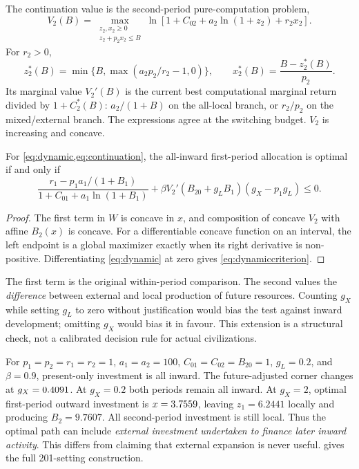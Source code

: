 The continuation value is the second-period pure-computation problem,
\begin{equation}
 V_2(B)=\max_{\substack{z_2,x_2\geq0\\z_2+p_2x_2\leq B}}\ln[1+C_{02}+a_2\ln(1+z_2)+r_2x_2].
 \label{eq:continuation}
\end{equation}
For $r_2>0$,
\begin{equation}
 z_2^*(B)=\min\{B,\max(a_2p_2/r_2-1,0)\},\qquad
 x_2^*(B)=\frac{B-z_2^*(B)}{p_2}.
 \label{eq:stage2}
\end{equation}
Its marginal value $V_2'(B)$ is the current best computational marginal return divided by $1+C_2^*(B)$: $a_2/(1+B)$ on the all-local branch, or $r_2/p_2$ on the mixed/external branch. The expressions agree at the switching budget. $V_2$ is increasing and concave.

\begin{proposition}
\label{prop:dynamic}
For \cref{eq:dynamic,eq:continuation}, the all-inward first-period allocation is optimal if and only if
\begin{equation}
 \frac{r_1-p_1a_1/(1+B_1)}{1+C_{01}+a_1\ln(1+B_1)}
 +\beta V_2'(B_{20}+g_LB_1)(g_X-p_1g_L)\leq0.
 \label{eq:dynamiccriterion}
\end{equation}
\end{proposition}
\begin{proof}
The first term in $W$ is concave in $x$, and composition of concave $V_2$ with affine $B_2(x)$ is concave. For a differentiable concave function on an interval, the left endpoint is a global maximizer exactly when its right derivative is non-positive. Differentiating \cref{eq:dynamic} at zero gives \cref{eq:dynamiccriterion}.
\end{proof}

The first term is the original within-period comparison. The second values the \emph{difference} between external and local production of future resources. Counting $g_X$ while setting $g_L$ to zero without justification would bias the test against inward development; omitting $g_X$ would bias it in favour. This extension is a structural check, not a calibrated decision rule for actual civilizations.

For $p_1=p_2=r_1=r_2=1$, $a_1=a_2=100$, $C_{01}=C_{02}=B_{20}=1$, $g_L=0.2$, and $\beta=0.9$, present-only investment is all inward. The future-adjusted corner changes at $g_X=0.4091$. At $g_X=0.2$ both periods remain all inward. At $g_X=2$, optimal first-period outward investment is $x=3.7559$, leaving $z_1=6.2441$ locally and producing $B_2=9.7607$. All second-period investment is still local. Thus the optimal path can include \emph{external investment undertaken to finance later inward activity}. This differs from claiming that external expansion is never useful.  gives the full 201-setting construction.

